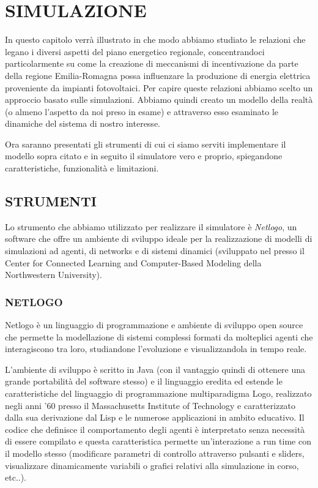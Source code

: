 \documentclass[12pt,a4paper,openright,twoside]{report}
\begin{document}
\chapter{SIMULAZIONE}

In questo capitolo verrà illustrato in che modo abbiamo studiato le relazioni che legano i diversi aspetti del piano energetico regionale, concentrandoci particolarmente su come la creazione di meccanismi di incentivazione da parte della regione Emilia-Romagna possa influenzare la produzione di energia elettrica proveniente da impianti fotovoltaici.
Per capire queste relazioni abbiamo scelto un approccio basato sulle simulazioni. Abbiamo quindi creato un modello della realtà (o almeno l'aspetto da noi preso in esame) e attraverso esso esaminato le dinamiche del sistema di nostro interesse.

Ora saranno presentati gli strumenti di cui ci siamo serviti implementare il modello sopra citato e in seguito il simulatore vero e proprio, spiegandone caratteristiche, funzionalità e limitazioni.

\section{STRUMENTI}

Lo strumento che abbiamo utilizzato per realizzare il simulatore  è \emph{Netlogo}, un software che offre un ambiente di sviluppo ideale per la realizzazione di modelli di simulazioni ad agenti, di networks e di sistemi dinamici (sviluppato nel presso il Center for Connected Learning and Computer-Based Modeling della Northwestern University).


\subsection{NETLOGO}

Netlogo è un linguaggio di programmazione e ambiente di sviluppo open source che permette la modellazione di sistemi complessi formati da molteplici agenti che interagiscono tra loro, studiandone l'evoluzione  e visualizzandola in tempo reale.

L'ambiente di sviluppo è scritto in Java (con il vantaggio quindi di ottenere una grande portabilità del software stesso) e il linguaggio eredita ed estende le caratteristiche del linguaggio di programmazione multiparadigma Logo, realizzato negli anni '60 presso il Massachusetts Institute of Technology e caratterizzato dalla sua derivazione dal Lisp e le numerose applicazioni in ambito educativo. Il codice che definisce il comportamento degli agenti è interpretato senza necessità di essere compilato e questa caratteristica permette un'interazione a run time con il modello stesso (modificare parametri di controllo attraverso pulsanti e sliders, visualizzare dinamicamente variabili o grafici relativi alla simulazione in corso, etc..).
\end{document}
